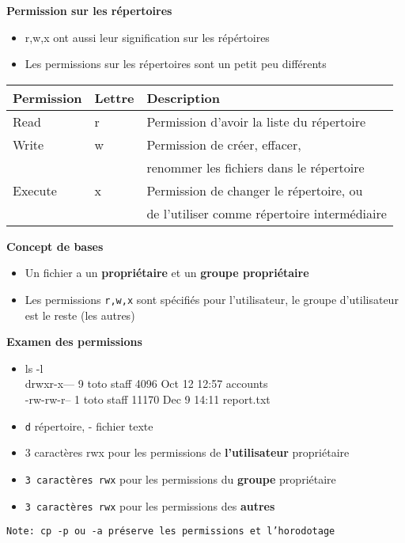 \documentclass[french]{beamer}
\begin{document}
\begin{frame}
\textbf{Permission sur les répertoires}
    \begin{itemize}
    \item r,w,x ont aussi leur signification sur les répértoires
    \item Les permissions sur les répertoires sont un petit peu différents
\end{itemize}
\begin{tabular}{|l|l|l|}
    \hline
    \textbf{Permission} & \textbf{Lettre} & \textbf{Description} \\
    \hline
    Read & r & Permission d'avoir la liste du répertoire \\
    Write & w & Permission de créer, effacer,\\ 
    & & renommer les fichiers dans le répertoire \\
    Execute & x & Permission de changer le répertoire, ou  \\
    & & de l'utiliser comme répertoire intermédiaire \\
    \hline
\end{tabular}
\end{frame}

\begin{frame}
\textbf{Concept de bases}
\begin{itemize}
\item Un fichier a un \textbf{propriétaire} et un \textbf{groupe propriétaire}
\item Les permissions \texttt{r,w,x} sont spécifiés pour l'utilisateur, le
groupe d'utilisateur est le reste (les autres)
\end{itemize}
\end{frame}

\begin{frame}
\textbf{Examen des permissions}
\begin{itemize}
\item ls -l \\
drwxr-x--- 9 toto staff  4096 Oct 12 12:57 accounts \\
-rw-rw-r-- 1 toto staff 11170 Dec 9 14:11 report.txt
\item \texttt{d} répertoire, {-} fichier texte
\item 3 caractères rwx pour les permissions de \textbf{l'utilisateur}
propriétaire
\item \texttt{3 caractères rwx} pour les permissions du \textbf{groupe}
propriétaire
\item \texttt{3 caractères rwx} pour les permissions des \textbf{autres}
\end{itemize}
\texttt{Note: cp -p ou -a préserve les permissions et l'horodotage}
\end{frame}
\end{document}
